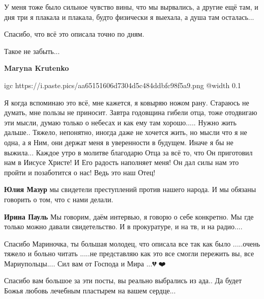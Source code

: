  
 
 
 
 

\qqSecCmt


У меня тоже было сильное чувство вины, что мы вырвались, а другие ещё там, и
дня три я плакала и плакала, будто физически я выехала, а душа там осталась...


Спасибо, что всё это описала точно по дням.


Такое не забыть...

\begin{itemize} %
\textbf{Maryna Krutenko}

\ifcmt
  igc https://i.paste.pics/aa65151606d7304d5c484ddbfc98f5a9.png
	@width 0.1
\fi

\end{itemize} %


Я когда вспоминаю это всё, мне кажется, я ковыряю ножом рану. Стараюсь не
думать, мне пользы не приносит. Завтра годовщина гибели отца, тоже отодвигаю
эти мысли, думаю только о небесах и как ему там хорошо..... Нужно жить
дальше.. Тяжело, непонятно, иногда даже не хочется жить, но мысли что я не одна,
а я Ним, они держат меня в уверенности в будущем. Иначе я бы не выжила... Каждое
утро в молитве благодарю Отца за всё то, что Он приготовил нам в Иисусе Христе!
И Его радость наполняет меня! Он дал силы нам это пройти и позаботится о нас!
Ведь это наш Отец!

\begin{itemize} %
\textbf{Юлия Мазур} мы свидетели преступлений против нашего народа. И мы обязаны говорить о том, что с нами делали.

\textbf{Ирина Пауль} Мы говорим, даём интервью, я говорю о себе конкретно. Мы где только можно давали свидетельство. И в прокуратуре, и на тв, и на радио....
\end{itemize} %


Спасибо Мариночка, ты большая молодец, что описала все так как было .....очень
тяжело и больно читать .....не представляю как это все смогли пережить вы, все
Мариупольцы.... Сил вам от Господа и Мира ...💔🙏❤️


Спасибо вам большое за эти посты, вы реально выбрались из ада.. Да будет Божья
любовь лечебным пластырем на вашем сердце...
